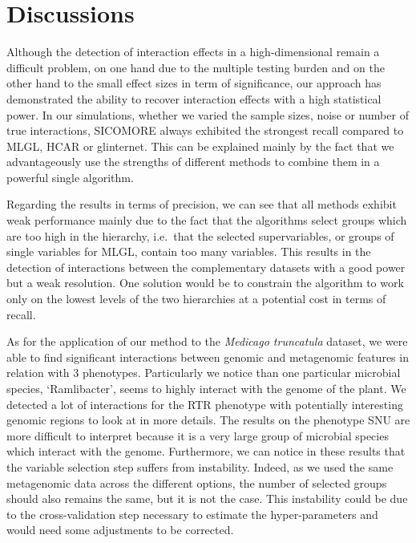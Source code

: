 \documentclass[]{book}
\begin{document}
\hypertarget{discussions-1}{%
\section{Discussions}\label{discussions-1}}

Although the detection of interaction effects in a high-dimensional
remain a difficult problem, on one hand due to the multiple testing
burden and on the other hand to the small effect sizes in term of
significance, our approach has demonstrated the ability to recover
interaction effects with a high statistical power. In our simulations,
whether we varied the sample sizes, noise or number of true
interactions, SICOMORE always exhibited the strongest recall compared to
MLGL, HCAR or glinternet. This can be explained mainly by the fact that
we advantageously use the strengths of different methods to combine them
in a powerful single algorithm.

Regarding the results in terms of precision, we can see that all methods
exhibit weak performance mainly due to the fact that the algorithms
select groups which are too high in the hierarchy, i.e.~that the
selected supervariables, or groups of single variables for MLGL, contain
too many variables. This results in the detection of interactions
between the complementary datasets with a good power but a weak
resolution. One solution would be to constrain the algorithm to work
only on the lowest levels of the two hierarchies at a potential cost in
terms of recall.

As for the application of our method to the \emph{Medicago truncatula}
dataset, we were able to find significant interactions between genomic
and metagenomic features in relation with 3 phenotypes. Particularly we
notice than one particular microbial species, `Ramlibacter', seems to
highly interact with the genome of the plant. We detected a lot of
interactions for the RTR phenotype with potentially interesting genomic
regions to look at in more details. The results on the phenotype SNU are
more difficult to interpret because it is a very large group of
microbial species which interact with the genome. Furthermore, we can
notice in these results that the variable selection step suffers from
instability. Indeed, as we used the same metagenomic data across the
different options, the number of selected groups should also remains the
same, but it is not the case. This instability could be due to the
cross-validation step necessary to estimate the hyper-parameters and
would need some adjustments to be corrected.
\end{document}
